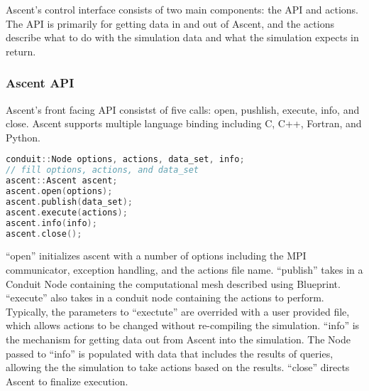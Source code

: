 Ascent's control interface consists of two main components:
the API and actions.
%
The API is primarily for getting data in and out of Ascent,
and the actions describe what to do with the simulation data
and what the simulation expects in return.

\subsubsection{Ascent API}
Ascent's front facing API consistst of five calls:
open, pushlish, execute, info, and close.
%
Ascent supports multiple language binding including C, C++,
Fortran, and Python.


\begin{lstlisting}[language=C++,caption={This cool caption}]
conduit::Node options, actions, data_set, info;
// fill options, actions, and data_set
ascent::Ascent ascent;
ascent.open(options);
ascent.publish(data_set);
ascent.execute(actions);
ascent.info(info);
ascent.close();
\end{lstlisting}

``open'' initializes ascent with a number of options including the
MPI communicator, exception handling, and the actions file name.
%
``publish'' takes in a Conduit Node containing the computational
mesh described using Blueprint.
%
``execute'' also takes in a conduit node containing the actions to
perform.
%
Typically, the parameters to ``exectute'' are overrided with a user provided
file, which allows actions to be changed without re-compiling the simulation.
%
``info'' is the mechanism for getting data out from Ascent into the simulation.
%
The Node passed to ``info'' is populated with data that includes the results
of queries, allowing the the simulation to take actions based on the results.
%
``close'' directs Ascent to finalize execution.


